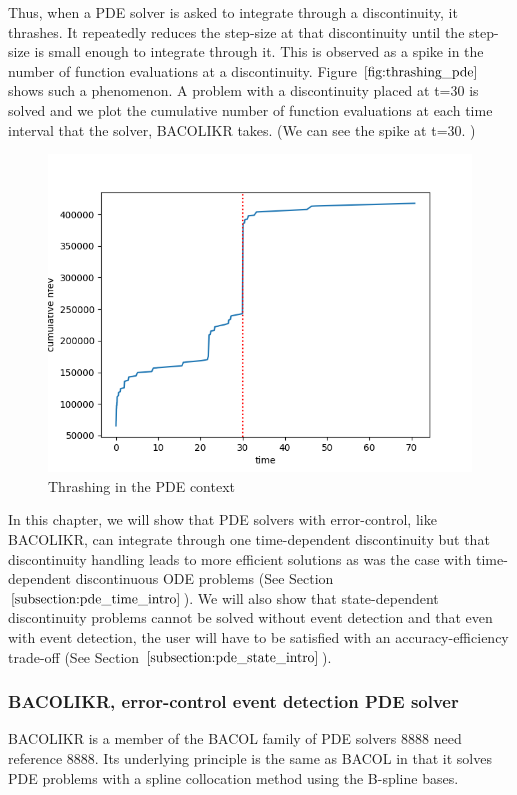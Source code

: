 \documentclass{article}
\begin{document}
Thus, when a PDE solver is asked to integrate through a discontinuity, it thrashes. It repeatedly reduces the step-size at that discontinuity until the step-size is small enough to integrate through it. This is observed as a spike in the number of function evaluations at a discontinuity. Figure $\ref{fig:thrashing_pde}$ shows such a phenomenon. A problem with a discontinuity placed at t=30 is solved and we plot the cumulative number of function evaluations at each time interval that the solver, BACOLIKR takes. (We can see the spike at t=30. )
\begin{figure}[H]
\centering
\includegraphics[width=0.7\linewidth]{./figures/pde_thrashing}
\caption{Thrashing in the PDE context}
\label{fig:thrashing_pde}
\end{figure}

In this chapter, we will show that PDE solvers with error-control, like BACOLIKR, can integrate through one time-dependent discontinuity but that discontinuity handling leads to more efficient solutions as was the case with time-dependent discontinuous ODE problems (See Section $\ref{subsection:pde_time_intro}$). We will also show that state-dependent discontinuity problems cannot be solved without event detection and that even with event detection, the user will have to be satisfied with an accuracy-efficiency trade-off (See Section $\ref{subsection:pde_state_intro}$).

\subsubsection{BACOLIKR, error-control event detection PDE solver}
\label{subsection:pde_software}
BACOLIKR is a member of the BACOL family of PDE solvers 8888 need reference 8888. Its underlying principle is the same as BACOL in that it solves PDE problems with a spline collocation method using the B-spline bases. 
\end{document}
